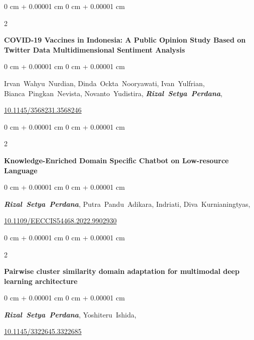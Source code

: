 \documentclass[10pt, letterpaper]{article}
\newenvironment{onecolentry}{
    \begin{adjustwidth}{
        0 cm + 0.00001 cm
    }{
        0 cm + 0.00001 cm
    }
}{
    \end{adjustwidth}
} %
\newenvironment{twocolentry}[2][]{
    \onecolentry
    \def\secondColumn{#2}
    \setcolumnwidth{\fill, 4.5 cm}
    \begin{paracol}{2}
}{
    \switchcolumn \raggedleft \secondColumn
    \end{paracol}
    \endonecolentry
} %
\begin{document}
        \vspace{0.3 cm}
        \begin{samepage}
            \begin{twocolentry}{2022}
                \textbf{COVID-19 Vaccines in Indonesia: A Public Opinion Study Based on Twitter Data Multidimensional Sentiment Analysis}
            \end{twocolentry}
            \vspace{0.10 cm}
            \begin{onecolentry}
                \mbox{Irvan Wahyu Nurdian},
                \mbox{Dinda Ockta Nooryawati},
                \mbox{Ivan Yulfrian},
                \mbox{Bianca Pingkan Nevista},
                \mbox{Novanto Yudistira},
                \mbox{\textbf{\textit{Rizal Setya Perdana}}},
                \vspace{0.10 cm}
                
                \href{https://doi.org/10.1145/3568231.3568246}{10.1145/3568231.3568246}
            \end{onecolentry}
        \end{samepage}
        \vspace{0.3 cm}
        \begin{samepage}
            \begin{twocolentry}{2022}
                \textbf{Knowledge-Enriched Domain Specific Chatbot on Low-resource Language}
            \end{twocolentry}
            \vspace{0.10 cm}
            \begin{onecolentry}
                \mbox{\textbf{\textit{Rizal Setya Perdana}}},
                \mbox{Putra Pandu Adikara},
                \mbox{Indriati},
                \mbox{Diva Kurnianingtyas},
                \vspace{0.10 cm}
                
                \href{https://doi.org/10.1109/EECCIS54468.2022.9902930}{10.1109/EECCIS54468.2022.9902930}
            \end{onecolentry}
        \end{samepage}
        \vspace{0.3 cm}
        \begin{samepage}
            \begin{twocolentry}{2019}
                \textbf{Pairwise cluster similarity domain adaptation for multimodal deep learning architecture}
            \end{twocolentry}
            \vspace{0.10 cm}
            \begin{onecolentry}
                \mbox{\textbf{\textit{Rizal Setya Perdana}}},
                \mbox{Yoshiteru Ishida},
                \vspace{0.10 cm}
                
                \href{https://doi.org/10.1145/3322645.3322685}{10.1145/3322645.3322685}
            \end{onecolentry}
        \end{samepage}
\end{document}
